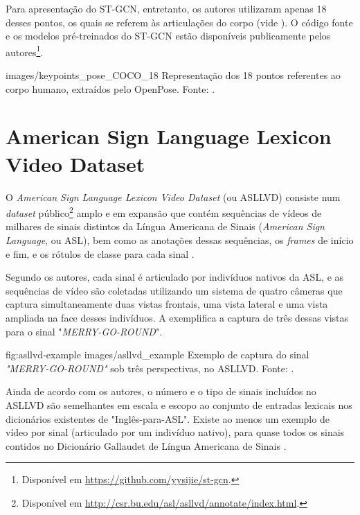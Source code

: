Para apresentação do ST-GCN, entretanto, os autores utilizaram apenas 18 desses pontos, os quais se referem às articulações do corpo (vide ). O código fonte e os modelos pré-treinados do ST-GCN estão disponíveis publicamente pelos autores\footnote{
    Disponível em \url{https://github.com/yysijie/st-gcn}.
}.

    {images/keypoints_pose_COCO_18}
    {Representação dos 18 pontos referentes ao corpo humano, extraídos pelo OpenPose. Fonte: \cite{openpose-output-2018}.}




\section{American Sign Language Lexicon Video Dataset} %

O \textit{American Sign Language Lexicon Video Dataset} (ou ASLLVD) consiste num \textit{dataset} público\footnote{
    Disponível em \url{http://csr.bu.edu/asl/asllvd/annotate/index.html}.
} amplo e em expansão que contém sequências de vídeos de milhares de sinais distintos da Língua Americana de Sinais (\textit{American Sign Language}, ou ASL), bem como as anotações dessas sequências, os \textit{frames} de início e fim, e os rótulos de classe para cada sinal \cite{athitsos-asllvd-2008, neidle-2012, vloger-2012}.

Segundo os autores, cada sinal é articulado por indivíduos nativos da ASL, e as sequências de vídeo são coletadas utilizando um sistema de quatro câmeras que captura simultaneamente duas vistas frontais, uma vista lateral e uma vista ampliada na face desses indivíduos. A  exemplifica a captura de três dessas vistas para o sinal "\textit{MERRY-GO-ROUND}".

\image
    {fig:asllvd-example}
    {images/asllvd_example}
    {Exemplo de captura do sinal \textit{"MERRY-GO-ROUND"} sob três perspectivas, no ASLLVD. Fonte:  \cite[p. 2]{athitsos-asllvd-2008}.}

Ainda de acordo com os autores, o número e o tipo de sinais incluídos no ASLLVD são semelhantes em escala e escopo ao conjunto de entradas lexicais nos dicionários existentes de "Inglês-para-ASL". Existe ao menos um exemplo de vídeo por sinal (articulado por um indivíduo nativo), para quase todos os sinais contidos no Dicionário Gallaudet de Língua Americana de Sinais \cite{athitsos-asllvd-2008, gallaudet-2005}. 

